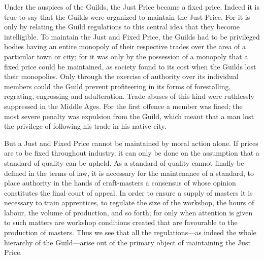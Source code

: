 \documentclass{book}
\begin{document}
Under the auspices of the Guilds, the Just Price became a fixed price. Indeed it is true to say that the Guilds were organized to maintain the Just Price. For it is only by relating the Guild regulations to this central idea that they become intelligible. To maintain the Just and Fixed Price, the Guilds had to be privileged bodies having an entire monopoly of their respective trades over the area of a particular town or city; for it was only by the possession of a monopoly that a fixed price could be maintained, as society found to its cost when the Guilds lost their monopolies. Only through the exercise of authority over its individual members could the Guild prevent profiteering in its forms of forestalling, regrating, engrossing and adulteration. Trade abuses of this kind were ruthlessly suppressed in the Middle Ages. For the first offence a member was fined; the most severe penalty was expulsion from the Guild, which meant that a man lost the privilege of following his trade in his native city.

But a Just and Fixed Price cannot be maintained by moral action alone. If prices are to be fixed throughout industry, it can only be done on the assumption that a standard of quality can be upheld. As a standard of quality cannot finally be defined in the terms of law, it is necessary for the maintenance of a standard, to place authority in the hands of craft-masters a consensus of whose opinion constitutes the final court of appeal. In order to ensure a supply of masters it is necessary to train apprentices, to regulate the size of the workshop, the hours of labour, the volume of production, and so forth; for only when attention is given to such matters are workshop conditions created that are favourable to the production of masters. Thus we see that all the regulations—as indeed the whole hierarchy of the Guild—arise out of the primary object of maintaining the Just Price.
\end{document}
